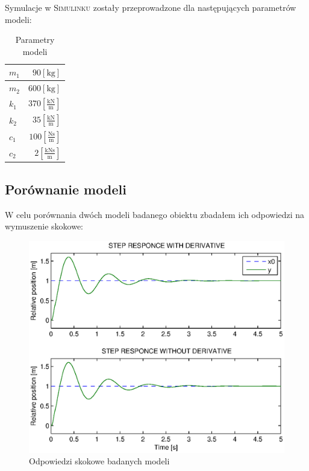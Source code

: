 \documentclass[12pt]{article}
\begin{document}
Symulacje w \textsc{Simulinku} zostały przeprowadzone dla następujących
parametrów modeli: 

\begin{table}[!htb]
	\begin{center}
		\renewcommand{\arraystretch}{1.4}
		\begin{tabular}{|l|r|}
		\hline 
			$m_1$ & $90 [\textrm{kg}]$ \\
		\hline
			$m_2$ & $600 [\textrm{kg}]$ \\
		\hline
			$k_1$ & $370 [\frac{\textrm{kN}}{\textrm{m}}]$ \\
		\hline
			$k_2$ & $35 [\frac{\textrm{kN}}{\textrm{m}}]$  \\
		\hline
			$c_1$ & $100 [\frac{\textrm{Ns}}{\textrm{m}}]$ \\
		\hline
			$c_2$ & $2 [\frac{\textrm{kNs}}{\textrm{m}}]$ \\
		\hline
		\end{tabular}
	\end{center}
	\caption{Parametry modeli}
	\label{ref:partab}
\end{table}

\subsection{Porównanie modeli}

W celu porównania dwóch modeli badanego obiektu zbadałem ich odpowiedzi na
wymuszenie skokowe:

\begin{figure}[!htb]
	\begin{center}
		\includegraphics[width=12cm]{../res/img/step_compare.eps}
	\end{center}
	\caption{Odpowiedzi skokowe badanych modeli}
\end{figure}
\end{document}
